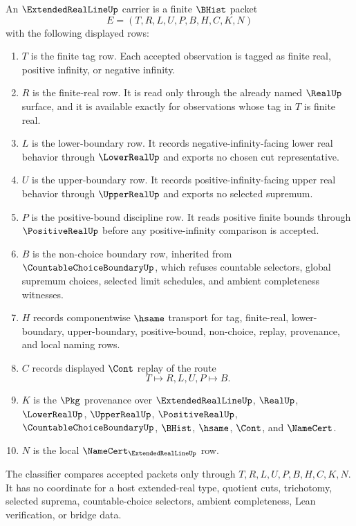 \begin{definition}
\label{def:extended-real-line-carrier}
An $\ExtendedRealLineUp$ carrier is a finite $\BHist$ packet
$$
E=(T,R,L,U,P,B,H,C,K,N)
$$
with the following displayed rows:
\begin{enumerate}
\item $T$ is the finite tag row. Each accepted observation is tagged as finite real, positive infinity, or negative infinity.
\item $R$ is the finite-real row. It is read only through the already named $\RealUp$ surface, and it is available exactly for observations whose tag in $T$ is finite real.
\item $L$ is the lower-boundary row. It records negative-infinity-facing lower real behavior through $\LowerRealUp$ and exports no chosen cut representative.
\item $U$ is the upper-boundary row. It records positive-infinity-facing upper real behavior through $\UpperRealUp$ and exports no selected supremum.
\item $P$ is the positive-bound discipline row. It reads positive finite bounds through $\PositiveRealUp$ before any positive-infinity comparison is accepted.
\item $B$ is the non-choice boundary row, inherited from $\CountableChoiceBoundaryUp$, which refuses countable selectors, global supremum choices, selected limit schedules, and ambient completeness witnesses.
\item $H$ records componentwise $\hsame$ transport for tag, finite-real, lower-boundary, upper-boundary, positive-bound, non-choice, replay, provenance, and local naming rows.
\item $C$ records displayed $\Cont$ replay of the route
$$
T\longmapsto R,L,U,P\longmapsto B .
$$
\item $K$ is the $\Pkg$ provenance over $\ExtendedRealLineUp$, $\RealUp$, $\LowerRealUp$, $\UpperRealUp$, $\PositiveRealUp$, $\CountableChoiceBoundaryUp$, $\BHist$, $\hsame$, $\Cont$, and $\NameCert$.
\item $N$ is the local $\NameCert_{\ExtendedRealLineUp}$ row.
\end{enumerate}
The classifier compares accepted packets only through $T,R,L,U,P,B,H,C,K,N$. It has no coordinate for a host extended-real type, quotient cuts, trichotomy, selected suprema, countable-choice selectors, ambient completeness, Lean verification, or bridge data.
\end{definition}

